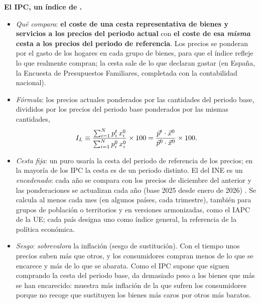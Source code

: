 \documentclass[11pt]{article}
\begin{document}
\begin{anotaciones}
\textbf{El IPC, un índice de .}
\begin{itemize}
\item \emph{Qué compara}: \textbf{el coste de una cesta representativa de bienes y servicios a los precios del periodo actual} con \textbf{el coste de esa \emph{misma} cesta a los precios del periodo de referencia}. Los precios se ponderan por el gasto de los hogares en cada grupo de bienes, para que el índice refleje lo que realmente compran; la cesta sale de lo que declaran gastar (en España, la Encuesta de Presupuestos Familiares, completada con la contabilidad nacional).
\item \emph{Fórmula}: los precios actuales ponderados por las cantidades del periodo base, divididos por los precios del periodo base ponderados por las mismas cantidades,
\[
I_L\equiv\frac{\sum_{i=1}^{N}p_i^t\,x_i^0}{\sum_{i=1}^{N}p_i^0\,x_i^0}\times100=\frac{\vec{p}^t\cdot\vec{x}^0}{\vec{p}^0\cdot\vec{x}^0}\times100 .
\]
\item \emph{Cesta fija}: un  puro usaría la cesta del periodo de referencia de los precios; en la mayoría de los IPC la cesta es de un periodo distinto. El del INE es un  \emph{encadenado}: cada año se compara con los precios de diciembre del anterior y las ponderaciones se actualizan cada año (base 2025 desde enero de 2026) \parencite{INE2026IPCMetodologia}. Se calcula al menos cada mes (en algunos países, cada trimestre), también para grupos de población o territorios y en versiones armonizadas, como el IAPC de la UE; cada país designa uno como índice general, la referencia de la política económica.
\item \emph{Sesgo}: \emph{sobrevalora} la inflación (sesgo de sustitución). Con el tiempo unos precios suben más que otros, y los consumidores compran menos de lo que se encarece y más de lo que se abarata. Como el IPC supone que siguen comprando la cesta del periodo base, da demasiado peso a los bienes que más se han encarecido: muestra más inflación de la que sufren los consumidores porque no recoge que sustituyen los bienes más caros por otros más baratos.
\end{itemize}
\end{anotaciones}
\end{document}
